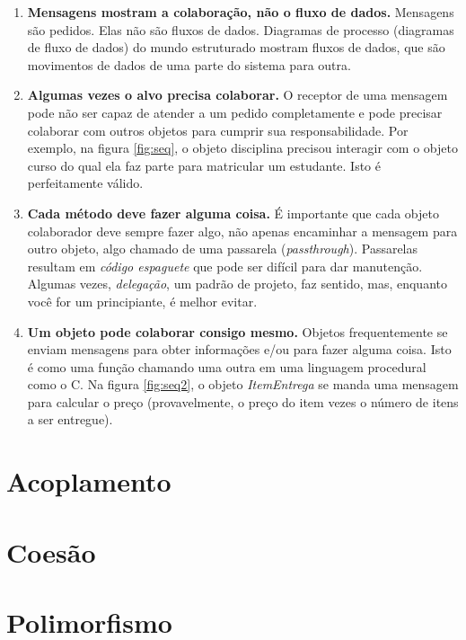 \documentclass[
	article,			%
	12pt,				%
	openright,
	twoside,			%
	a4paper,			%
	english,			%
	french,
	brazil,				%
	sumario=tradicional
	]{abntex2}
\begin{document}
\begin{enumerate}
\item \textbf{Mensagens mostram a colaboração, não o fluxo de dados.} Mensagens são pedidos. Elas não são fluxos de dados. Diagramas de processo (diagramas de fluxo de dados) do mundo estruturado mostram fluxos de dados, que são movimentos de dados de uma parte do sistema para outra.

\item \textbf{Algumas vezes o alvo precisa colaborar.} O receptor de uma mensagem pode não ser capaz de atender a um pedido completamente  e pode precisar colaborar com outros objetos para cumprir sua responsabilidade. Por exemplo, na figura \ref{fig:seq}, o objeto disciplina precisou interagir com o objeto curso do qual ela faz parte para matricular um estudante. Isto é perfeitamente válido.

\item \textbf{Cada método deve fazer alguma coisa.} É importante que cada objeto colaborador deve sempre fazer algo, não apenas encaminhar a mensagem para outro objeto, algo chamado de uma passarela (\textit{passthrough}). Passarelas resultam em \textit{código espaguete} que pode ser difícil para dar manutenção. Algumas vezes, \textit{delegação}, um padrão de projeto, faz sentido, mas, enquanto você for um principiante, é melhor evitar.

\item \textbf{Um objeto pode colaborar consigo mesmo.} Objetos frequentemente se enviam mensagens para obter informações e/ou para fazer alguma coisa. Isto é como uma função chamando uma outra em uma linguagem procedural como o C. Na figura \ref{fig:seq2}, o objeto \emph{ItemEntrega} se manda uma mensagem para calcular o preço (provavelmente, o preço do item vezes o número de itens a ser entregue).

\end{enumerate}

\section{Acoplamento}

\section{Coesão}

\section{Polimorfismo}
\end{document}
